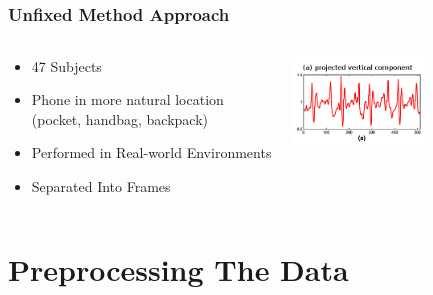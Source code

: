 \documentclass{beamer}
\begin{document}
\subsection{}
\begin{frame}
  \frametitle{Unfixed Method Approach}

  \begin{columns}
  \begin{column}{0.6\textwidth}
  \begin{itemize}
  	\item 47 Subjects
  	\linebreak
    \item Phone in more natural location (pocket, handbag, backpack)
  	\linebreak
  	\item Performed in Real-world Environments
  	\linebreak
  	\item Separated Into Frames
  \end{itemize}
  \end{column}
  \begin{column}{0.7\textwidth}
   \includegraphics[width=0.6\textwidth]{Illustrations/frame.jpg}
  \end{column}
  \end{columns}
\end{frame}





\section[Preprocessing the data]{Preprocessing The Data}
\end{document}
